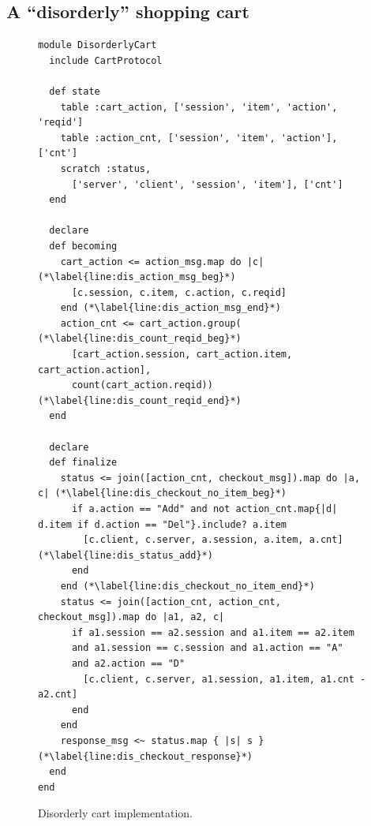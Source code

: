 \subsection{A ``disorderly'' shopping cart}

\begin{figure}[t]
\begin{scriptsize}
\begin{lstlisting}
module DisorderlyCart
  include CartProtocol

  def state
    table :cart_action, ['session', 'item', 'action', 'reqid']
    table :action_cnt, ['session', 'item', 'action'], ['cnt']
    scratch :status, 
      ['server', 'client', 'session', 'item'], ['cnt']
  end

  declare
  def becoming
    cart_action <= action_msg.map do |c|  (*\label{line:dis_action_msg_beg}*)
      [c.session, c.item, c.action, c.reqid] 
    end (*\label{line:dis_action_msg_end}*)
    action_cnt <= cart_action.group(  (*\label{line:dis_count_reqid_beg}*)
      [cart_action.session, cart_action.item, cart_action.action],
      count(cart_action.reqid))  (*\label{line:dis_count_reqid_end}*)
  end

  declare
  def finalize
    status <= join([action_cnt, checkout_msg]).map do |a, c| (*\label{line:dis_checkout_no_item_beg}*)
      if a.action == "Add" and not action_cnt.map{|d| d.item if d.action == "Del"}.include? a.item
        [c.client, c.server, a.session, a.item, a.cnt] (*\label{line:dis_status_add}*)
      end
    end (*\label{line:dis_checkout_no_item_end}*)
    status <= join([action_cnt, action_cnt, checkout_msg]).map do |a1, a2, c|
      if a1.session == a2.session and a1.item == a2.item
      and a1.session == c.session and a1.action == "A" 
      and a2.action == "D"
        [c.client, c.server, a1.session, a1.item, a1.cnt - a2.cnt]
      end
    end
    response_msg <~ status.map { |s| s } (*\label{line:dis_checkout_response}*)
  end
end
\end{lstlisting}
\vspace{-10pt}
\caption{Disorderly cart implementation.}
\label{fig:dis-cart}
\end{scriptsize}
\vspace{-2pt}
\end{figure}

